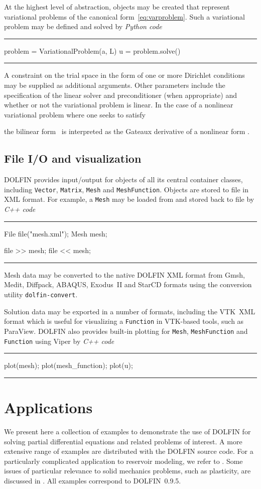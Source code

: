 \documentclass[acmtoms]{acmtrans2m}
\newenvironment{pythoncode}[1]{\center\minipage{#1\textwidth}\footnotesize\hfill\it Python code \rm\vspace{0.1cm}\hrule\renewcommand{\baselinestretch}{0.9}\footnotesize\verbatim}{\endverbatim\hrule\normalsize\endminipage\newline\endcenter}
\newenvironment{cppcode}[1]{\center\minipage{#1\textwidth}\footnotesize\hfill\it C++ code \rm\vspace{0.1cm}\hrule\renewcommand{\baselinestretch}{0.9}\footnotesize\verbatim}{\endverbatim\hrule\normalsize\endminipage\newline\endcenter}
\newcommand{\emp}[1]{\texttt{#1}}
\newcommand{\dolfin}{DOLFIN}
\begin{document}
At the highest level of abstraction, objects may be created that
represent variational problems of the canonical
form~\eqref{eq:varproblem}. Such a variational problem may be defined
and solved by
\begin{pythoncode}{0.9}
problem = VariationalProblem(a, L)
u = problem.solve()
\end{pythoncode}
A constraint on the trial space in the form of one or more Dirichlet
conditions may be supplied as additional arguments. Other parameters
include the specification of the linear solver and preconditioner
(when appropriate) and whether or not the variational problem is
linear. In the case of a nonlinear variational problem where
one seeks to satisfy

the bilinear form~ is interpreted as the Gateaux derivative of a
nonlinear form .

\subsection{File I/O and visualization}

\dolfin{} provides input/output for objects of all its central
container classes, including \emp{Vector}, \emp{Matrix}, \emp{Mesh} and
\emp{MeshFunction}. Objects are stored to file in XML format. For
example, a \emp{Mesh} may be loaded from and stored back to file by
\begin{cppcode}{0.9}
File file("mesh.xml");
Mesh mesh;

file >> mesh;
file << mesh;
\end{cppcode}
Mesh data may be converted to the native \dolfin{} XML format
from Gmsh, Medit, Diffpack, ABAQUS, Exodus~II and
StarCD formats using the conversion utility \emp{dolfin-convert}.

Solution data may be exported in a number of formats, including the
VTK~XML format which is useful for visualizing a \emp{Function} in
VTK-based tools, such as ParaView.
\dolfin{} also provides built-in plotting for \emp{Mesh},
\emp{MeshFunction} and \emp{Function} using Viper \cite{www:Viper} by
\begin{cppcode}{0.9}
plot(mesh);
plot(mesh_function);
plot(u);
\end{cppcode}

\section{Applications}
\label{sec:applications}

We present here a collection of examples to demonstrate the use of
\dolfin{} for solving partial differential equations and related
problems of interest. A more extensive range of examples are
distributed with the \dolfin{} source code. For a particularly
complicated application to reservoir modeling, we refer to
. Some issues of particular relevance to solid
mechanics problems, such as plasticity,
are discussed in . All examples correspond to
\dolfin{}~0.9.5.
\end{document}
